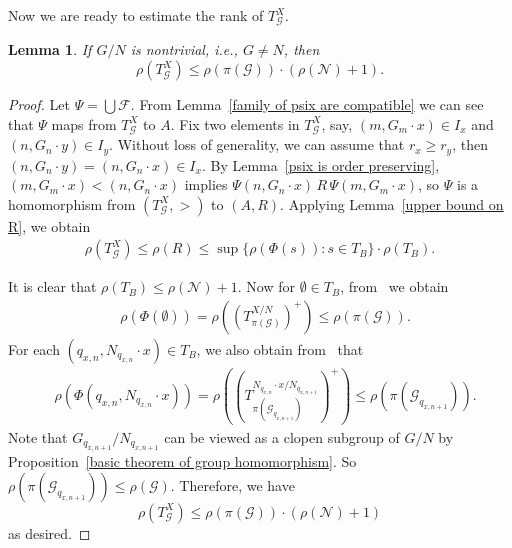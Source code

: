 \documentclass[11pt]{amsart}
\newtheorem{lemma}[theorem]{Lemma}
\theoremstyle{definition}
\theoremstyle{remark}
\numberwithin{equation}{section}
\def\otr#1#2{T_{\mathcal{#1}}^{#2}}
\begin{document}
Now we are ready to estimate the rank of $\otr{G}{X}$.
\begin{lemma}\label{upper bound on rank of orbit tree}
    If $G/N$ is nontrivial, i.e., $G\neq N$, then
    $$\rho(\otr{G}{X})\leq\rho(\pi(\mathcal{G}))\cdot(\rho(\mathcal{N})+1).$$
\end{lemma}
\begin{proof}
Let $\Psi=\bigcup\mathcal{F}$. From Lemma~\ref{family of psix are compatible} we can see that $\Psi$ maps from $\otr{G}{X}$ to $A$.
Fix two elements in $\otr{G}{X}$, say, $(m,G_m\cdot x)\in I_x$ and $(n,G_n\cdot y)\in I_y$. Without loss of generality, we can assume that $r_x\ge r_y$,
then $(n,G_n\cdot y)=(n,G_n\cdot x)\in I_x$. By Lemma~\ref{psix is order preserving}, $(m,G_m\cdot x)<(n,G_n\cdot x)$ implies $\Psi(n,G_n\cdot x)\,R\,\Psi(m,G_m\cdot x)$,
so $\Psi$ is a homomorphism from $(\otr{G}{X},>)$ to $(A,R)$. Applying Lemma~\ref{upper bound on R}, we obtain
    \begin{align*}
        \rho(\otr{G}{X})\leq\rho(R)\leq\sup\{\rho(\Phi(s)):s\in T_B\}\cdot\rho(T_B).
    \end{align*}

    It is clear that $\rho(T_B)\leq\rho(\mathcal{N})+1$. Now for $\emptyset\in T_B$, from~\cite[Corollary 3.12]{DingW} we obtain
    \begin{align*}
        &\rho(\Phi(\emptyset))=\rho((T_{\pi(\mathcal{G})}^{X/N})^+)\leq\rho(\pi(\mathcal{G})).
    \end{align*}
    For each $(q_{x,n},N_{q_{x,n}}\cdot x)\in T_B$, we also obtain from~\cite[Corollary 3.12]{DingW} that
    \begin{align*}
        &\rho(\Phi(q_{x,n},N_{q_{x,n}}\cdot x))=\rho((T_{\pi(\mathcal{G}_{q_{x,n+1}})}^{N_{q_{x,n}}\cdot x/N_{q_{x,n+1}}})^+)\leq\rho(\pi(\mathcal{G}_{q_{x,n+1}})).
    \end{align*}
    Note that $G_{q_{x,n+1}}/N_{q_{x,n+1}}$ can be viewed as a clopen subgroup of $G/N$ by Proposition~\ref{basic theorem of group homomorphism}. So $\rho(\pi(\mathcal{G}_{q_{x,n+1}}))\leq\rho(\mathcal{G})$. Therefore, we have
    $$\rho(\otr{G}{X})\leq\rho(\pi(\mathcal{G}))\cdot(\rho(\mathcal{N})+1)$$
as desired.
\end{proof}
\end{document}
